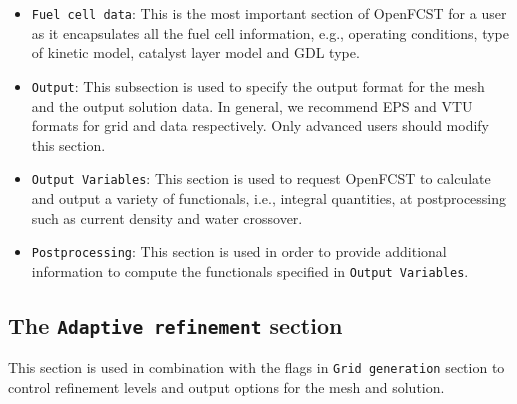 \begin{itemize}
 \item \texttt{Fuel cell data}: This is the most important section of OpenFCST for a user as it encapsulates all the fuel cell information, e.g., operating conditions, type of kinetic model, catalyst layer model and GDL type.
 \item \texttt{Output}: This subsection is used to specify the output format for the mesh and the output solution data. In general, we recommend EPS and VTU formats for grid and data respectively. Only advanced users should modify this section.
 \item \texttt{Output Variables}: This section is used to request OpenFCST to calculate and output a variety of functionals, i.e., integral quantities, at postprocessing such as current density and water crossover.
 \item \texttt{Postprocessing}: This section is used in order to provide additional information to compute the functionals specified in \texttt{Output Variables}.
\end{itemize}

\subsection{The \texttt{Adaptive refinement} section}

This section is used in combination with the flags in \texttt{Grid generation} section to control refinement levels and output options for the mesh and solution. 

